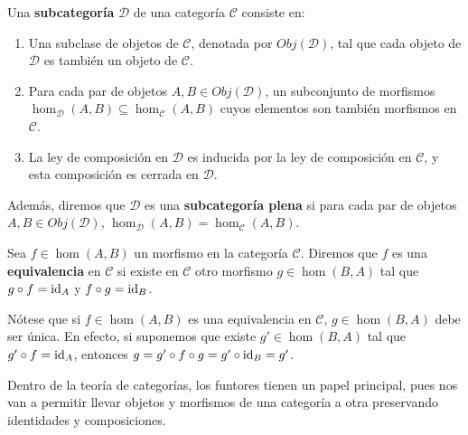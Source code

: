 \begin{definicion}
	Una \textbf{subcategoría} \(\mathcal{D}\) de una categoría \(\mathcal{C}\) consiste en:
	\begin{enumerate}
		\item Una subclase de objetos de \(\mathcal{C}\), denotada por \(Obj(\mathcal{D})\), tal que cada objeto de \(\mathcal{D}\) es también un objeto de \(\mathcal{C}\).
		\item Para cada par de objetos \(A, B \in Obj(\mathcal{D})\), un subconjunto de morfismos \(\hom_{\mathcal{D}}(A, B) \subseteq \hom_{\mathcal{C}}(A, B)\) cuyos elementos son también morfismos en \(\mathcal{C}\).
		\item La ley de composición en \(\mathcal{D}\) es inducida por la ley de composición en \(\mathcal{C}\), y esta composición es cerrada en \(\mathcal{D}\).
	\end{enumerate}
	Además, diremos que \(\mathcal{D}\) es una \textbf{subcategoría plena} si para cada par de objetos \(A, B \in Obj(\mathcal{D})\), \(\hom_{\mathcal{D}}(A, B) = \hom_{\mathcal{C}}(A, B)\).
\end{definicion}

\begin{definicion}
	Sea \(f \in \hom(A,B)\) un morfismo en la categoría \(\mathcal{C}\). Diremos que
	\(f\) es una \textbf{equivalencia} en \(\mathcal{C}\) si existe en \(\mathcal{C}\) otro
	morfismo \(g \in \hom(B,A)\) tal que \(g \circ f = \operatorname{id}_{A}\) y \(f \circ g = \operatorname{id}_{B}\).
\end{definicion}
\begin{observacion}
	Nótese que si \(f \in \hom(A,B)\) es una equivalencia en \(\mathcal{C}\),
	\(g \in \hom(B,A)\) debe ser única. En efecto, si suponemos que existe
	\(g' \in \hom(B,A)\) tal que \(g' \circ f = \operatorname{id}_{A}\), entonces \(g = g'\circ f \circ
	g = g' \circ \operatorname{id}_{B}= g'\).
\end{observacion}

Dentro de la teoría de categorías, los funtores tienen un papel principal, pues
nos van a permitir llevar objetos y morfismos de una categoría a otra preservando
identidades y composiciones.

